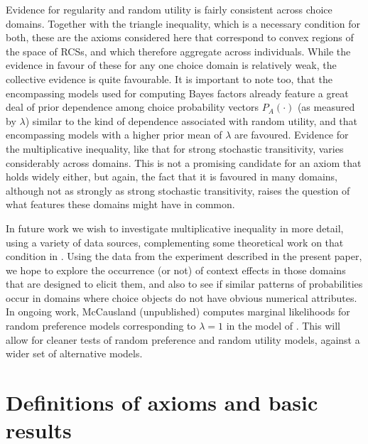 \documentclass[11pt,letter]{article}
\begin{document}
Evidence for regularity and random utility is fairly consistent across choice domains.
Together with the triangle inequality, which is a necessary condition for both, these are the axioms considered here that correspond to convex regions of the space of RCSs, and which therefore aggregate across individuals.
While the evidence in favour of these for any one choice domain is relatively weak, the collective evidence is quite favourable.
It is important to note too, that the encompassing models used for computing Bayes factors already feature a great deal of prior dependence among choice probability vectors $P_A(\cdot)$ (as measured by $\lambda$) similar to the kind of dependence associated with random utility, and that encompassing models with a higher prior mean of $\lambda$ are favoured.
Evidence for the multiplicative inequality, like that for strong stochastic transitivity, varies considerably across domains.
This is not a promising candidate for an axiom that holds widely either, but again, the fact that it is favoured in many domains, although not as strongly as strong stochastic transitivity, raises the question of what features these domains might have in common.

In future work we wish to investigate  multiplicative inequality in more detail, using a variety of data sources, complementing some theoretical work on that condition in .
Using the data from the experiment described in the present paper, we hope to explore the occurrence (or not) of context effects in those domains that are designed to elicit them, and also to see if similar patterns of probabilities occur in domains where choice objects do not have obvious numerical attributes.
In ongoing work, McCausland (unpublished) computes marginal likelihoods for random preference models corresponding to $\lambda = 1$ in the model of .
This will allow for cleaner tests of random preference and random utility models, against a wider set of alternative models.

\appendix

\section{Definitions of axioms and basic results}\label{s:axioms}
\end{document}
